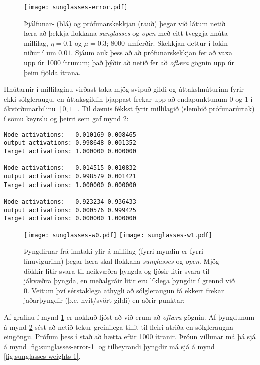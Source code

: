 \documentclass[a4paper,icelandic]{article}
\begin{document}
\begin{figure}[h!]
  \begin{center}
    \texttt{[image: sunglasses-error.pdf]}
  \end{center}
  \caption{Þjálfunar- (blá) og prófunarskekkjan (rauð) þegar við látum
  netið læra að þekkja flokkana \emph{sunglasses} og \emph{open} með
  eitt tveggja-hnúta millilag, $\eta=0.1$ og $\mu=0.3$; 8000
  umferðir. Skekkjan dettur í lokin niður í um $0.01$.
  Sjáum auk þess að að prófunarskekkjan fer að vaxa upp úr
  1000 ítrunum; það þýðir að netið fer að \emph{oflæra} gögnin upp úr
  þeim fjölda ítrana.}
  \label{fig:sunglasses-error}
\end{figure}
Hnútarnir í millilaginu virðast taka mjög svipuð gildi og
úttakshnúturinn fyrir ekki-sólgleraugu, en úttaksgildin þjappast frekar
upp að endapunktunum 0 og 1 í ákvörðunarbilinu $[0,1]$. Til dæmis fékkst
fyrir millilagið (slembið prófunarúrtak) í sömu keyrslu og þeirri sem
gaf mynd \ref{fig:sunglasses-weights}:
\begin{verbatim}
Node activations:   0.010169 0.008465 
output activations: 0.998648 0.001352 
Target activations: 1.000000 0.000000 

Node activations:   0.014515 0.010832 
output activations: 0.998579 0.001421 
Target activations: 1.000000 0.000000 

Node activations:   0.923234 0.936433 
output activations: 0.000576 0.999425 
Target activations: 0.000000 1.000000 
\end{verbatim}

\begin{figure}[h!]
  \begin{center}
    \texttt{[image: sunglasses-w0.pdf]}
    \texttt{[image: sunglasses-w1.pdf]}
  \end{center}
  \caption{Þyngdirnar frá inntaki yfir á millilag (fyrri myndin er fyrri
  línuvigurinn) þegar læra skal flokkana \emph{sunglasses} og
  \emph{open}. Mjög dökkir litir svara til neikvæðra þyngda og ljósir
  litir svara til jákvæðra þyngda, en meðalgráir litir eru líklega
  þyngdir í grennd við 0. Veitum því sérstaklega athygli að sólgleraugun
  fá ekkert frekar jaðarþyngdir (þ.e. hvít/svört gildi) en aðrir punktar; }
  \label{fig:sunglasses-weights}
\end{figure}

Af grafinu í mynd \ref{fig:sunglasses-error} er nokkuð ljóst að við erum
að \emph{oflæra} gögnin. Af þyngdunum á mynd
\ref{fig:sunglasses-weights} sést að netið tekur greinilega tillit til
fleiri atriða en sólgleraugna eingöngu. Prófum þess í stað að hætta
eftir 1000 ítranir. Þróun villunar má þá sjá á mynd
\ref{fig:sunglasses-error-1} og tilheyrandi þyngdir má sjá á mynd
\ref{fig:sunglasses-weights-1}.
\end{document}
